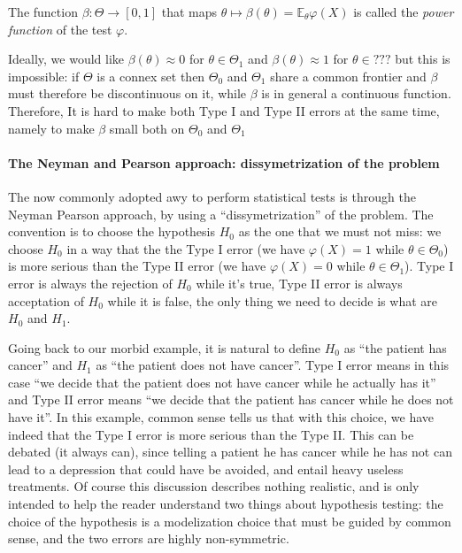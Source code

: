 \documentclass[
	fontsize=11pt, %
	twoside=false, %
	numbers=noenddot, %
]{kaobook}
\newcommand{\E}{\mathbb E}
\newcommand{\goes}{\rightarrow}
\begin{document}
The function $\beta : \Theta \goes [0, 1]$ that maps $\theta \mapsto \beta(\theta) = \E_\theta \varphi(X)$ is called the \emph{power function} of the test $\varphi$.

Ideally, we would like $\beta(\theta) \approx 0$ for $\theta \in \Theta_1$ and $\beta(\theta) \approx 1$ for $\theta \in ???$  but this is impossible: if $\Theta$ is a connex set then $\Theta_0$ and $\Theta_1$ share a common frontier and $\beta$ must therefore be discontinuous on it, while $\beta$ is in general a continuous function.
Therefore, It is hard to make both Type I and Type II errors at the same time, namely to make $\beta$ small both on $\Theta_0$ and $\Theta_1$

\paragraph{The Neyman and Pearson approach: dissymetrization of the problem} %

The now commonly adopted awy to perform statistical tests is through the Neyman Pearson approach, by using a ``dissymetrization'' of the problem.
The convention is to choose the hypothesis $H_0$ as the one that we must not miss: we choose $H_0$ in a way that the the Type I error (we have $\varphi(X)=1$ while $\theta \in \Theta_0$) is more serious than the Type II error (we have $\varphi(X)=0$ while $\theta \in \Theta_1$).
Type I error is always the rejection of $H_0$ while it's true, Type II error is always acceptation of $H_0$ while it is false, the only thing we need to decide is what are $H_0$ and $H_1$.

Going back to our morbid example, it is natural to define $H_0$ as ``the patient has cancer'' and $H_1$ as ``the patient does not have cancer''.
Type I error means in this case ``we decide that the patient does not have cancer while he actually has it'' and Type II error means ``we decide that the patient has cancer while he does not have it''.
In this example, common sense tells us that with this choice, we have indeed that the Type I error is more serious than the Type II. 
This can be debated (it always can), since telling a patient he has cancer while he has not can lead to a depression that could have be avoided, and entail heavy useless treatments. 
Of course this discussion describes nothing realistic, and is only intended to help the reader understand two things about hypothesis testing: the choice of the hypothesis is a modelization choice that must be guided by common sense, and the two errors are highly non-symmetric.
\end{document}
